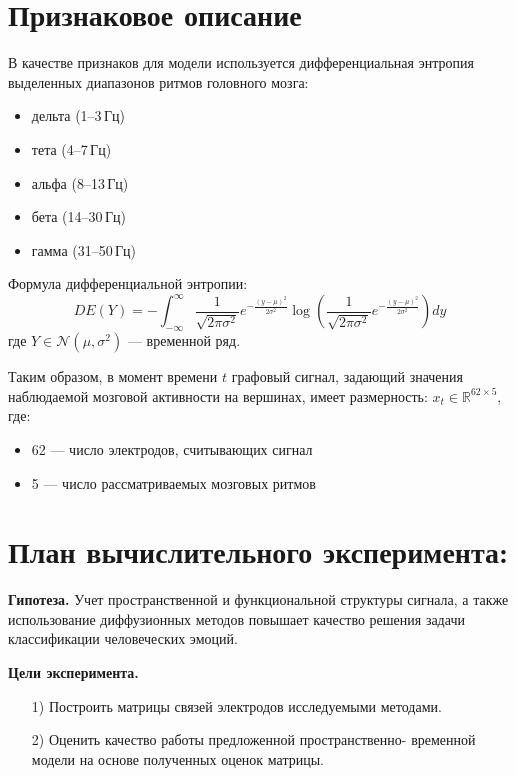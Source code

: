 \documentclass[12pt, twoside]{article}
\begin{document}
\section{Признаковое описание}

В качестве признаков для модели используется дифференциальная энтропия выделенных диапазонов ритмов головного мозга:
\begin{itemize}
    \item дельта (1--3\,Гц)
    \item тета (4--7\,Гц)
    \item альфа (8--13\,Гц)
    \item бета (14--30\,Гц)
    \item гамма (31--50\,Гц)
\end{itemize}

Формула дифференциальной энтропии:
\begin{equation}
DE(Y) = -\int_{-\infty}^{\infty} \frac{1}{\sqrt{2\pi\sigma^2}} e^{-\frac{(y - \mu)^2}{2\sigma^2}} \log \left( \frac{1}{\sqrt{2\pi\sigma^2}} e^{-\frac{(y - \mu)^2}{2\sigma^2}} \right) dy
\end{equation}
где $Y \in \mathcal{N}(\mu, \sigma^2)$ --- временной ряд.

Таким образом, в момент времени $t$ графовый сигнал, задающий значения наблюдаемой мозговой активности на вершинах, имеет размерность:
\(
x_t \in \mathbb{R}^{62 \times 5},
\)
где:
\begin{itemize}
    \item 62 --- число электродов, считывающих сигнал
    \item 5 --- число рассматриваемых мозговых ритмов
\end{itemize}

\section{План вычислительного эксперимента:}
\textbf{Гипотеза.} Учет пространственной и функциональной структуры сигнала, а также использование диффузионных методов повышает качество решения задачи классификации человеческих эмоций.

\textbf{Цели эксперимента.}
\begin{itemize}
    \item[1)] Построить матрицы связей электродов исследуемыми методами.
    \item[2)] Оценить качество работы предложенной пространственно-   временной модели на основе полученных оценок матрицы.
\end{itemize}
\end{document}
